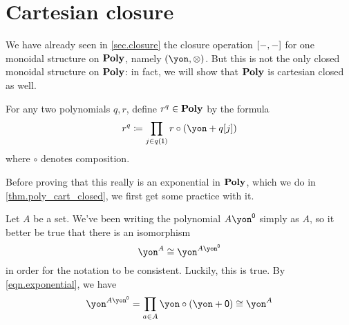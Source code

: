 \documentclass[Book-Poly]{subfiles}
\begin{document}


\section{Cartesian closure}


We have already seen in \cref{sec.closure} the closure operation $[-,-]$ for one monoidal structure on $\mathbf{Poly}$, namely $(\yon,\otimes)$.
But this is not the only closed monoidal structure on $\mathbf{Poly}$: in fact, we will show that $\mathbf{Poly}$ is cartesian closed as well.

For any two polynomials $q,r$, define $r^q\in\mathbf{Poly}$ by the formula
\begin{equation}\label{eqn.exponential}
  r^q\coloneqq\prod_{j\in q(\1)}r\circ(\yon+q[j])
\end{equation}
where $\circ$ denotes composition.

Before proving that this really is an exponential in $\mathbf{Poly}$, which we do in \cref{thm.poly_cart_closed}, we first get some practice with it.

\begin{example}
Let $A$ be a set. We've been writing the polynomial $A\yon^\0$ simply as $A$, so it better be true that there is an isomorphism
\[
    \yon^A \iso \yon^{A\yon^\0}
\]
in order for the notation to be consistent.
Luckily, this is true.
By \eqref{eqn.exponential}, we have
\[
    \yon^{A\yon^\0} = \prod_{a\in A} \yon \circ (\yon+\0) \iso \yon^A
\]
\end{example}
\end{document}
